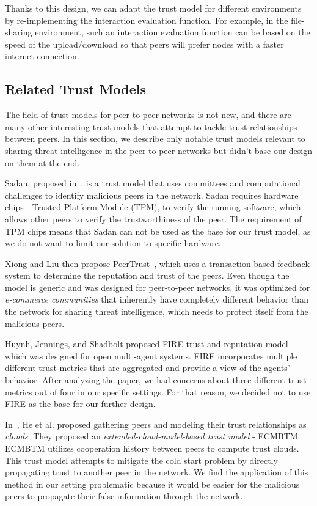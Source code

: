 Thanks to this design, we can adapt the trust model for different environments by re-implementing the interaction evaluation function.
For example, in the file-sharing environment, such an interaction evaluation function can be based on the speed of the upload/download so that peers will prefer nodes with a faster internet connection.


\subsection{Related Trust Models}
\label{subsec:related-trust-models}
The field of trust models for peer-to-peer networks is not new, and there are many other interesting trust models that attempt to tackle trust relationships between peers.
In this section, we describe only notable trust models relevant to sharing threat intelligence in the peer-to-peer networks but didn't base our design on them at the end.

Sadan, proposed in~\cite{abera2019sadan}, is a trust model that uses committees and computational challenges to identify malicious peers in the network.
Sadan requires hardware chips - Trusted Platform Module (TPM), to verify the running software, which allows other peers to verify the trustworthiness of the peer.
The requirement of TPM chips means that Sadan can not be used as the base for our trust model, as we do not want to limit our solution to specific hardware.

Xiong and Liu then propose PeerTrust~\cite{xiong2004peertrust}, which uses a transaction-based feedback system to determine the reputation and trust of the peers.
Even though the model is generic and was designed for peer-to-peer networks, it was optimized for \textit{e-commerce communities} that inherently have completely different behavior than the network for sharing threat intelligence, which needs to protect itself from the malicious peers.

Huynh, Jennings, and Shadbolt proposed FIRE trust and reputation model~\cite{huynh2006integrated} which was designed for open multi-agent systems.
FIRE incorporates multiple different trust metrics that are aggregated and provide a view of the agents' behavior.
After analyzing the paper, we had concerns about three different trust metrics out of four in our specific settings.
For that reason, we decided not to use FIRE as the base for our further design.

In~\cite{1562680}, He et al. proposed gathering peers and modeling their trust relationships as \textit{clouds}. They proposed an \textit{extended-cloud-model-based trust model} - ECMBTM.
ECMBTM utilizes cooperation history between peers to compute trust clouds. 
This trust model attempts to mitigate the cold start problem by directly propagating trust to another peer in the network.
We find the application of this method in our setting problematic because it would be easier for the malicious peers to propagate their false information through the network.

